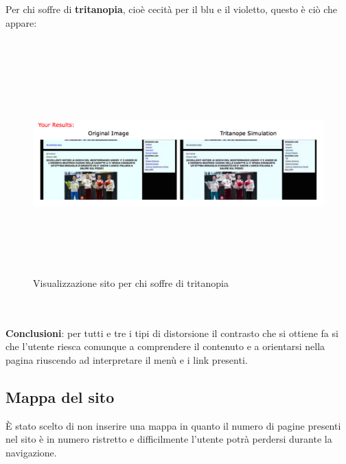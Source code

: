 	\\
	\\ Per chi soffre di \textbf{tritanopia}, cio\`e cecit\`a per il blu e il violetto, questo \`e ci\`o che appare:
	\\
	\\ 
	\begin{figure}[h]
		\centering
		\includegraphics[width=150mm, height=85mm]{images/contrasto_pagina_tritanope.png}
		\caption{Visualizzazione sito per chi soffre di tritanopia}
	\end{figure}
	\\
	\\ \textbf{Conclusioni}: per tutti e tre i tipi di distorsione il contrasto che si ottiene fa si che l'utente riesca comunque a comprendere il contenuto e a orientarsi nella pagina riuscendo ad interpretare il men\`u e i link presenti.

\subsection{Mappa del sito}
\`E stato scelto di non inserire una mappa in quanto il numero di pagine presenti nel sito \`e in numero ristretto e difficilmente l'utente potr\`a perdersi durante la navigazione.